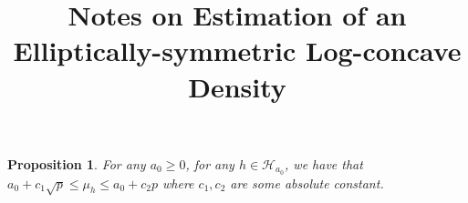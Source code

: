 \message{ !name(elliptical.tex)}\documentclass[12pt]{article}
\title{Notes on Estimation of an Elliptically-symmetric Log-concave Density}
\newtheorem{proposition}[theorem]{Proposition}
\begin{document}

\begin{proposition}
  For any $a_0 \geq 0$, for any $h \in \mathcal{H}_{a_0}$, we have that $a_0 + c_1 \sqrt{p} \leq \mu_h \leq a_0 + c_2 p $ where $c_1, c_2$ are some absolute constant.
\end{proposition}
\end{document}

